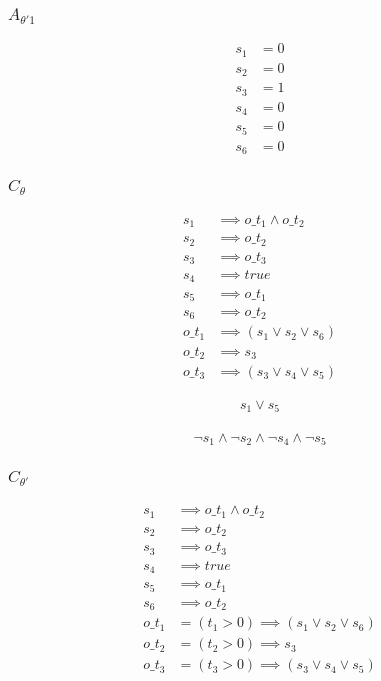 \documentclass{article}
\begin{document}
\subsubsection{$A_{\theta'1}$}
\begin{align*}
  s_1 &= 0 \\
  s_2 &= 0 \\
  s_3 &= 1 \\
  s_4 &= 0 \\
  s_5 &= 0 \\
  s_6 &= 0
\end{align*}

\subsubsection{$C_\theta$}

\begin{align*}
  s_1 &\implies o\_t_1 \land o\_t_2 \\
  s_2 &\implies o\_t_2 \\
  s_3 &\implies o\_t_3 \\
  s_4 &\implies true \\
  s_5 &\implies o\_t_1 \\
  s_6 &\implies o\_t_2 \\
  o\_t_1 &\implies (s_1 \lor s_2 \lor s_6) \\
  o\_t_2 &\implies s_3 \\
  o\_t_3 &\implies (s_3 \lor s_4 \lor s_5)
\end{align*}

\begin{align*}
  s_1 \lor s_5
\end{align*}

\begin{align*}
  \neg s_1 \land \neg s_2 \land \neg s_4 \land \neg s_5
\end{align*}

\subsubsection{$C_{\theta'}$}

\begin{align*}
  s_1 &\implies o\_t_1 \land o\_t_2 \\
  s_2 &\implies o\_t_2 \\
  s_3 &\implies o\_t_3 \\
  s_4 &\implies true \\
  s_5 &\implies o\_t_1 \\
  s_6 &\implies o\_t_2 \\
  o\_t_1 &= (t_1 > 0) \implies (s_1 \lor s_2 \lor s_6) \\
  o\_t_2 &= (t_2 > 0) \implies s_3 \\
  o\_t_3 &= (t_3 > 0) \implies (s_3 \lor s_4 \lor s_5)
\end{align*}
\end{document}

